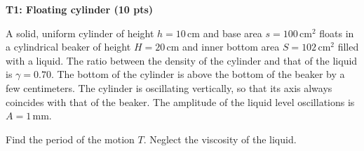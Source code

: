 \textbf{T1: Floating cylinder (10 pts)}

A solid, uniform cylinder of height $h = 10\,\mathrm{cm}$ and base area
$s = 100\,\mathrm{cm^2}$ floats in a cylindrical beaker of height
$H = 20\,\mathrm{cm}$ and inner bottom area $S = 102\,\mathrm{cm^2}$ filled
with a liquid. The ratio between the density of the cylinder and that of the
liquid is $\gamma = 0.70$. The bottom of the cylinder is above the bottom of
the beaker by a few centimeters. The cylinder is oscillating vertically, so
that its axis always coincides with that of the beaker. The amplitude of the
liquid level oscillations is $A = 1\,\mathrm{mm}$.

Find the period of the motion $T$. Neglect the viscosity of the liquid.
